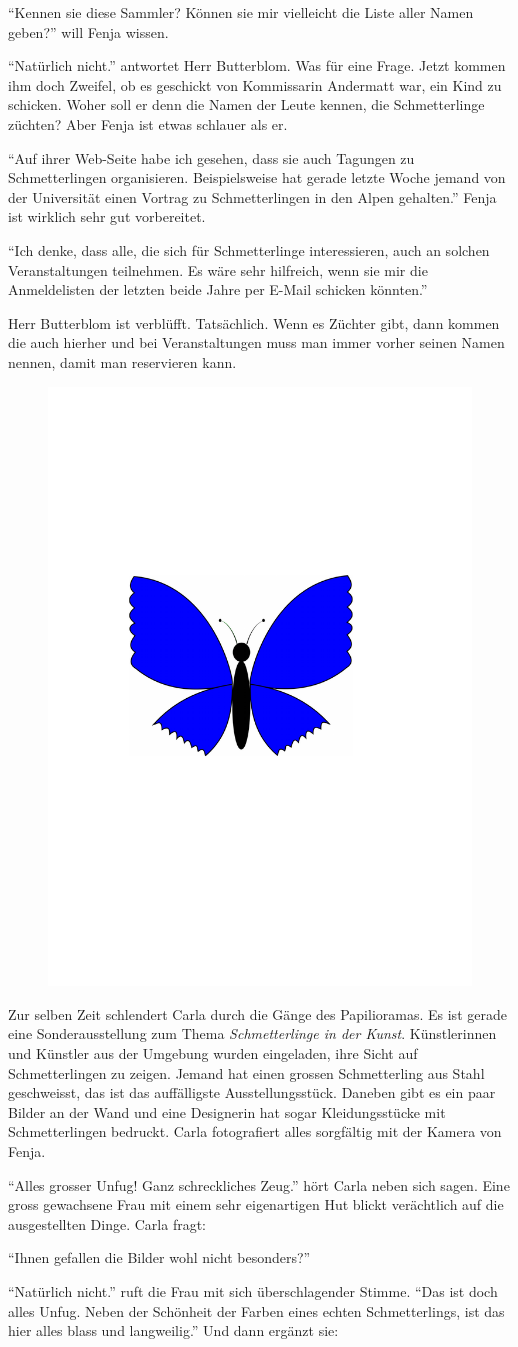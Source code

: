 \enquote{Kennen sie diese Sammler? Können sie mir vielleicht die Liste aller Namen geben?} will Fenja wissen.

\enquote{Natürlich nicht.} antwortet Herr Butterblom. Was für eine Frage. Jetzt kommen ihm doch Zweifel, ob es geschickt von Kommissarin Andermatt war, ein Kind zu schicken. Woher soll er denn die Namen der Leute kennen, die Schmetterlinge züchten? Aber Fenja ist etwas schlauer als er.

\enquote{Auf ihrer Web-Seite habe ich gesehen, dass sie auch Tagungen zu Schmetterlingen organisieren. Beispielsweise hat gerade letzte Woche jemand von der Universität einen Vortrag zu Schmetterlingen in den Alpen gehalten.} Fenja ist wirklich sehr gut vorbereitet. 

\enquote{Ich denke, dass alle, die sich für Schmetterlinge interessieren, auch an solchen Veranstaltungen teilnehmen. Es wäre sehr hilfreich, wenn sie mir die Anmeldelisten der letzten beide Jahre per E-Mail schicken könnten.}

Herr Butterblom ist verblüfft. Tatsächlich. Wenn es Züchter gibt, dann kommen die auch hierher und bei Veranstaltungen muss man immer vorher seinen Namen nennen, damit man reservieren kann. 
\begin{figure}[H]
\centering
\includegraphics[width=.05\textwidth]{bilder/inkling.pdf}
\end{figure}
Zur selben Zeit schlendert Carla durch die Gänge des Papilioramas. Es ist gerade eine Sonderausstellung zum Thema \emph{Schmetterlinge in der Kunst}. Künstlerinnen und Künstler aus der Umgebung wurden eingeladen, ihre Sicht auf Schmetterlingen zu zeigen. Jemand hat einen grossen Schmetterling aus Stahl geschweisst, das ist das auffälligste Ausstellungsstück. Daneben gibt es ein paar Bilder an der Wand und eine Designerin hat sogar Kleidungsstücke mit Schmetterlingen bedruckt. Carla fotografiert alles sorgfältig mit der Kamera von Fenja.

\enquote{Alles grosser Unfug! Ganz schreckliches Zeug.} hört Carla neben sich sagen. Eine gross gewachsene Frau mit einem sehr eigenartigen Hut blickt verächtlich auf die ausgestellten Dinge. Carla fragt:

\enquote{Ihnen gefallen die Bilder wohl nicht besonders?}

\enquote{Natürlich nicht.} ruft die Frau mit sich überschlagender Stimme. \enquote{Das ist doch alles Unfug. Neben der Schönheit der Farben eines echten Schmetterlings, ist das hier alles blass und langweilig.} Und dann ergänzt sie:

